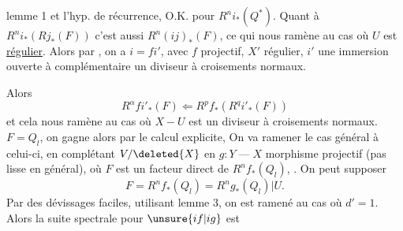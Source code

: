 lemme 1 et l'hyp. de récurrence,
O.K. pour \(R^ni_*(Q^*)\).
Quant à \(R^ni_*(Rj_*(F))\)
c'est aussi \(R^n(ij)_*(F)\), ce qui nous ramène au cas où \(U\) est \uline{régulier}.
Alors par , on a \(i=fi'\),
avec \(f\) projectif, \(X'\) régulier, \(i'\) une immersion ouverte à complémentaire
un diviseur à croisements normaux.


Alors
\[
R^\alpha fi'_*(F)\Longleftarrow R^pf_*(R^qi'_*(F))
\]
et cela nous ramène  au cas où
\(X-U\) est un diviseur à croisements normaux.
 \(F=Q_l\), on gagne alors par le calcul explicite,
On va ramener le cas général à celui-ci, en complétant \(V/\deleted{X}\) en
\(g:Y\mathbin{\text{---}}X\) morphisme projectif (pas lisse en général),
où \(F\) est un facteur direct de \(R^nf_*(Q_l)\),
.
On peut supposer
\[
F=R^nf_*(Q_l)=R^ng_*(Q_l)|U.
\]
Par des dévissages faciles, utilisant lemme 3,
on est ramené au cas où \(d'=1\).
Alors la suite spectrale pour \(\unsure{if|ig}\) est
